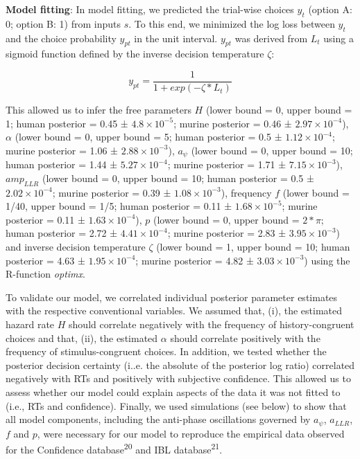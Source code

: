 \documentclass[
]{article}
\begin{document}
\textbf{Model fitting}: In model fitting, we predicted the trial-wise
choices \(y_t\) (option A: 0; option B: 1) from inputs \(s\). To this
end, we minimized the log loss between \(y_t\) and the choice
probability \(y_{p t}\) in the unit interval. \(y_{p t}\) was derived
from \(L_t\) using a sigmoid function defined by the inverse decision
temperature \(\zeta\):

\begin{equation}
y_{p t} = \frac{1}{1 + exp(-\zeta * L_t)}
\end{equation}

This allowed us to infer the free parameters \(H\) (lower bound = 0,
upper bound = 1; human posterior = 0.45 ±
\ensuremath{4.8\times 10^{-5}}; murine posterior = 0.46 ±
\ensuremath{2.97\times 10^{-4}}), \(\alpha\) (lower bound = 0, upper
bound = 5; human posterior = 0.5 ± \ensuremath{1.12\times 10^{-4}};
murine posterior = 1.06 ± \ensuremath{2.88\times 10^{-3}}), \(a_{\psi}\)
(lower bound = 0, upper bound = 10; human posterior = 1.44 ±
\ensuremath{5.27\times 10^{-4}}; murine posterior = 1.71 ±
\ensuremath{7.15\times 10^{-3}}), \(amp_{LLR}\) (lower bound = 0, upper
bound = 10; human posterior = 0.5 ± \ensuremath{2.02\times 10^{-4}};
murine posterior = 0.39 ± \ensuremath{1.08\times 10^{-3}}), frequency
\(f\) (lower bound = 1/40, upper bound = 1/5; human posterior = 0.11 ±
\ensuremath{1.68\times 10^{-5}}; murine posterior = 0.11 ±
\ensuremath{1.63\times 10^{-4}}), \(p\) (lower bound = 0, upper bound =
\(2*\pi\); human posterior = 2.72 ± \ensuremath{4.41\times 10^{-4}};
murine posterior = 2.83 ± \ensuremath{3.95\times 10^{-3}}) and inverse
decision temperature \(\zeta\) (lower bound = 1, upper bound = 10; human
posterior = 4.63 ± \ensuremath{1.95\times 10^{-4}}; murine posterior =
4.82 ± \ensuremath{3.03\times 10^{-3}}) using the R-function
\emph{optimx}.

To validate our model, we correlated individual posterior parameter
estimates with the respective conventional variables. We assumed that,
(i), the estimated hazard rate \(H\) should correlate negatively with
the frequency of history-congruent choices and that, (ii), the estimated
\(\alpha\) should correlate positively with the frequency of
stimulus-congruent choices. In addition, we tested whether the posterior
decision certainty (i..e. the absolute of the posterior log ratio)
correlated negatively with RTs and positively with subjective
confidence. This allowed us to assess whether our model could explain
aspects of the data it was not fitted to (i.e., RTs and confidence).
Finally, we used simulations (see below) to show that all model
components, including the anti-phase oscillations governed by
\(a_{\psi}\), \(a_{LLR}\), \(f\) and \(p\), were necessary for our model
to reproduce the empirical data observed for the Confidence
database\textsuperscript{20} and IBL database\textsuperscript{21}.
\end{document}
